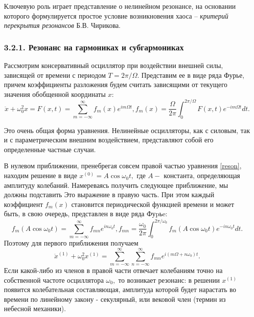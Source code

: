 \documentclass[11pt]{article}
\begin{document}
Ключевую роль играет представление о нелинейном резонансе, на основании
которого формулируется простое условие возникновения хаоса --
\emph{критерий перекрытия резонансов} Б.В. Чирикова.

\hypertarget{ux440ux435ux437ux43eux43dux430ux43dux441-ux43dux430-ux433ux430ux440ux43cux43eux43dux438ux43aux430ux445-ux438-ux441ux443ux431ux433ux430ux440ux43cux43eux43dux438ux43aux430ux445}{%
\subsubsection{3.2.1. Резонанс на гармониках и
субгармониках}\label{ux440ux435ux437ux43eux43dux430ux43dux441-ux43dux430-ux433ux430ux440ux43cux43eux43dux438ux43aux430ux445-ux438-ux441ux443ux431ux433ux430ux440ux43cux43eux43dux438ux43aux430ux445}}

Рассмотрим консервативный осциллятор при воздействии внешней силы,
зависящей от времени с периодом \(T=2 \pi / \Omega .\) Представим ее в
виде ряда Фурье, причем коэффициенты разложения будем считать зависящими
от текущего значения обобщенной координаты \(x:\) \begin{equation}
\label{reson}
\ddot{x}+\omega_{0}^{2} x=F(x, t)=\sum_{m=-\infty}^{\infty} f_{m}(x) e^{i m \Omega t}, f_{m}(x)=\frac{\Omega}{2 \pi} \int_{0}^{2 \pi / \Omega} F(x, t) e^{-i m \Omega t} d t.
\end{equation}

Это очень общая форма уравнения. Нелинейные осцилляторы, как с силовым,
так и с параметрическим внешним воздействием, представляют собой его
определенные частные случаи.

В нулевом приближении, пренебрегая совсем правой частью уравнения
\eqref{reson}, находим решение в виде \(x^{(0)}=A \cos \omega_{0} t,\)
где \(A-\) константа, определяющая амплитуду колебаний. Намереваясь
получить следующее приближение, мы должны подставить Это выражение в
правую часть. При этом каждый коэффициент \(f_{m}(x)\) становится
периодической функцией времени и может быть, в свою очередь, представлен
в виде ряда Фуpьe: \[
f_{m}\left(A \cos \omega_{0} t\right)=\sum_{m=-\infty}^{\infty} f_{m n} e^{i n \omega_{0} t}, f_{m n}=\frac{\omega_{0}}{2 \pi} \int_{0}^{2 \pi / \omega_{0}} f_{m}\left(A \cos \omega_{0} t\right) e^{-i n \omega_{0} t} d t.
\] Поэтому для первого приближения получаем \[
\ddot{x}^{(1)}+\omega_{0}^{2} x^{(1)}=\sum_{m=-\infty}^{\infty} \sum_{n=-\infty}^{\infty} f_{m n} e^{i\left(m \Omega+n \omega_{0}\right) t}.
\] Если какой-либо из членов в правой части отвечает колебаниям точно на
собственной частоте осциллятора \(\omega_{0},\) то возникает резонанс: в
решении \(x^{(1)}\) появится колебательная составляющая, амплитуда
которой будет нарастать во времени по линейному закону - секулярный, или
вековой член (термин из небесной механики).
\end{document}
